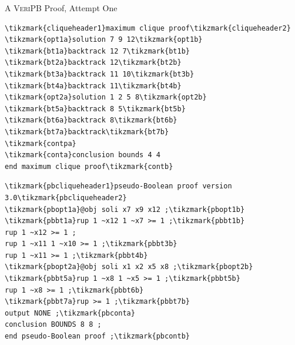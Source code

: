 \documentclass[aspectratio=169,compress,10pt]{beamer}
\makeatletter
\newcommand{\proofsystemformat}[1]{\textsc{#1}\@}
\newcommand{\veripb}{\proofsystemformat{VeriPB}\xspace}
\makeatother
\begin{document}
\begin{frame}[fragile,t]{A \veripb Proof, Attempt One}
\begin{minipage}{0.35\textwidth}
\begin{Verbatim}[commandchars=\\\{\},codes={\catcode`$=3\catcode`^=7}]
\tikzmark{cliqueheader1}maximum clique proof\tikzmark{cliqueheader2}
\tikzmark{opt1a}solution 7 9 12\tikzmark{opt1b}
\tikzmark{bt1a}backtrack 12 7\tikzmark{bt1b}
\tikzmark{bt2a}backtrack 12\tikzmark{bt2b}
\tikzmark{bt3a}backtrack 11 10\tikzmark{bt3b}
\tikzmark{bt4a}backtrack 11\tikzmark{bt4b}
\tikzmark{opt2a}solution 1 2 5 8\tikzmark{opt2b}
\tikzmark{bt5a}backtrack 8 5\tikzmark{bt5b}
\tikzmark{bt6a}backtrack 8\tikzmark{bt6b}
\tikzmark{bt7a}backtrack\tikzmark{bt7b}
\tikzmark{contpa}
\tikzmark{conta}conclusion bounds 4 4
end maximum clique proof\tikzmark{contb}
\end{Verbatim}
\end{minipage}\begin{minipage}{0.45\textwidth}
\begin{Verbatim}[commandchars=\\\{\},codes={\catcode`$=3\catcode`^=7}]
\tikzmark{pbcliqueheader1}pseudo-Boolean proof version 3.0\tikzmark{pbcliqueheader2}
\tikzmark{pbopt1a}@obj soli x7 x9 x12 ;\tikzmark{pbopt1b}
\tikzmark{pbbt1a}rup 1 ~x12 1 ~x7 >= 1 ;\tikzmark{pbbt1b}
rup 1 ~x12 >= 1 ;
rup 1 ~x11 1 ~x10 >= 1 ;\tikzmark{pbbt3b}
rup 1 ~x11 >= 1 ;\tikzmark{pbbt4b}
\tikzmark{pbopt2a}@obj soli x1 x2 x5 x8 ;\tikzmark{pbopt2b}
\tikzmark{pbbt5a}rup 1 ~x8 1 ~x5 >= 1 ;\tikzmark{pbbt5b}
rup 1 ~x8 >= 1 ;\tikzmark{pbbt6b}
\tikzmark{pbbt7a}rup >= 1 ;\tikzmark{pbbt7b}
output NONE ;\tikzmark{pbconta}
conclusion BOUNDS 8 8 ;
end pseudo-Boolean proof ;\tikzmark{pbcontb}
\end{Verbatim}
\end{minipage}%
\end{frame}
\end{document}
